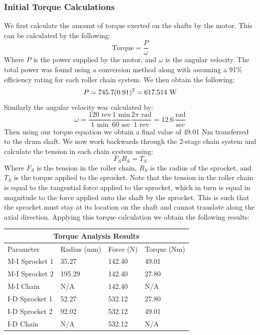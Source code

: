 \documentclass[letterpaper,12pt]{article}
\begin{document}
\subsubsection{Initial Torque Calculations}
We first calculate the amount of torque exerted on the shafts by the motor. This can be calculated by the following:
\begin{equation*}
    \text{Torque} = \dfrac{P}{\omega}
\end{equation*}
Where $P$ is the power supplied by the motor, and $\omega$ is the angular velocity. The total power was found using a conversion method along with assuming a 91\% efficiency rating for each roller chain system. We then obtain the following:
\begin{equation*}
    P = 745.7(0.91)^2 = 617.514 \text{ W} \\
\end{equation*}
Similarly the angular velocity was calculated by:
\begin{equation*}
    \omega = \dfrac{120 \text{ rev}}{1 \text{ min}}\dfrac{1 \text{ min}}{60 \text{ sec}}\dfrac{2\pi \text{ rad}}{1 \text{ rev}} = 12.6\, \dfrac{\text{rad}}{\text{sec}}
\end{equation*}
Then using our torque equation we obtain a final value of 49.01 Nm transferred to the drum shaft. We now work backwards through the 2-stage chain system and calculate the tension in each chain system using:
\begin{equation*}
    F_SR_S = T_S
\end{equation*}
Where $F_S$ is the tension in the roller chain, $R_S$ is the radius of the sprocket, and $T_S$ is the torque applied to the sprocket. Note that the tension in the roller chain is equal to the tangential force applied to the sprocket, which in turn is equal in magnitude to the force applied onto the shaft by the sprocket. This is such that the sprocket must stay at its location on the shaft and cannot translate along the axial direction. Applying this torque calculation we obtain the following results:
\begin{center}
	\begin{tabular}{ |p{3cm}||p{2.5cm}|p{2.5cm}|p{2.5cm}|  }
		\hline
		\multicolumn{4}{|c|}{Torque Analysis Results} \\
		\hline
		Parameter & Radius (mm) & Force (N) & Torque (Nm)\\
		\hline
		M-I Sprocket 1 & 35.27 & 142.40 & 49.01 \\
		M-I Sprocket 2 & 195.29 & 142.40 & 27.80 \\
		M-I Chain & N/A & 142.40 & N/A \\
		I-D Sprocket 1 & 52.27 & 532.12 & 27.80 \\
		I-D Sprocket 2 & 92.02 & 532.12 & 49.01 \\
		I-D Chain & N/A & 532.12 & N/A \\
		\hline
	\end{tabular}
\end{center}
\end{document}
